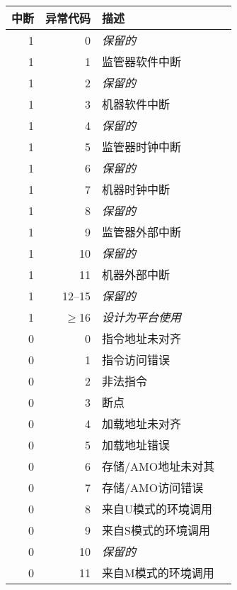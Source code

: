 \begin{table*}[htbp]
\begin{center}
\begin{tabular}{|r|r|l|l|}

  \hline
  中断 & 异常代码  & 描述 \\
  \hline
  1         & 0               & {\em 保留的} \\
  1         & 1               & 监管器软件中断 \\
  1         & 2               & {\em 保留的} \\
  1         & 3               & 机器软件中断 \\ \hline
  1         & 4               & {\em 保留的} \\
  1         & 5               & 监管器时钟中断 \\
  1         & 6               & {\em 保留的} \\
  1         & 7               & 机器时钟中断 \\ \hline
  1         & 8               & {\em 保留的} \\
  1         & 9               & 监管器外部中断 \\
  1         & 10              & {\em 保留的} \\
  1         & 11              & 机器外部中断 \\ \hline
  1         & 12--15          & {\em 保留的} \\
  1         & $\ge$16         & {\em 设计为平台使用} \\ \hline
  0         & 0               & 指令地址未对齐 \\
  0         & 1               & 指令访问错误 \\
  0         & 2               & 非法指令 \\
  0         & 3               & 断点 \\
  0         & 4               & 加载地址未对齐 \\
  0         & 5               & 加载地址错误 \\
  0         & 6               & 存储/AMO地址未对其 \\
  0         & 7               & 存储/AMO访问错误 \\
  0         & 8               & 来自U模式的环境调用 \\
  0         & 9               & 来自S模式的环境调用 \\
  0         & 10              & {\em 保留的} \\
  0         & 11              & 来自M模式的环境调用 \\

\end{tabular}
\end{center}
\end{table*}
